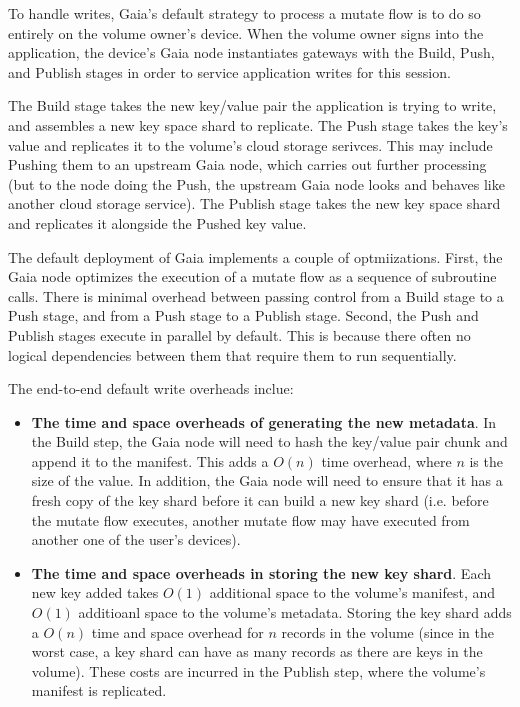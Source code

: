 To handle writes, Gaia's default strategy to process a
mutate flow is to do so entirely on the volume owner's device.  When the volume
owner signs into the application, the device's Gaia node instantiates gateways with the Build,
Push, and Publish stages in order to service application writes for this session.

The Build stage takes the new key/value pair the application is trying to write,
and assembles a new key space shard to replicate.  The Push stage takes the
key's value and replicates it to the volume's cloud storage
serivces.  This may include Pushing them to an upstream Gaia node, which carries
out further processing (but to the node doing the Push, the upstream Gaia node
looks and behaves like another cloud storage service).  The Publish stage takes
the new key space shard and replicates it alongside the Pushed key value.

The default deployment of Gaia implements a couple of optmiizations.
First, the Gaia node optimizes the execution of a mutate flow as a sequence
of subroutine calls.  There is minimal overhead between passing control from a
Build stage to a Push stage, and from a Push stage to a Publish stage.
Second, the Push and Publish stages execute in parallel by default.  This is
because there often no logical dependencies between them that require them
to run sequentially.

The end-to-end default write overheads inclue:

\begin{itemize}
\item \textbf{The time and space overheads of generating the new metadata}.  In
the Build step, the Gaia node will need to hash the key/value pair
chunk and append it to the manifest.  This adds a $O(n)$ time overhead, where
$n$ is the size of the value.  In addition, the Gaia node will need to ensure
that it has a fresh copy of the key shard before it can build a new key
shard (i.e. before the mutate flow executes, another mutate flow may have
executed from another one of the user's devices).
\item \textbf{The time and space overheads in storing the new key shard}.  Each new
key added takes $O(1)$ additional space to the volume's manifest, and $O(1)$
additioanl space to the volume's metadata.
Storing the key shard adds a $O(n)$ time and space overhead for $n$ records in the volume
(since in the worst case, a key shard can have as many records as there are
keys in the volume).  These costs are incurred in the Publish step, where the
volume's manifest is replicated.
\end{itemize}

